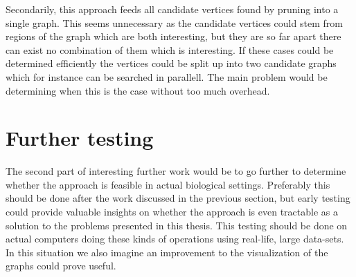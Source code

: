 \documentclass[thesis.tex]{subfiles}
\begin{document}
\par\noindent
Secondarily, this approach feeds all candidate vertices found by pruning into a single graph. This seems unnecessary as the candidate vertices could stem from regions of the graph which are both interesting, but they are so far apart there can exist no combination of them which is interesting. If these cases could be determined efficiently the vertices could be split up into two candidate graphs which for instance can be searched in parallell. The main problem would be determining when this is the case without too much overhead.
\section{Further testing}
The second part of interesting further work would be to go further to determine whether the approach is feasible in actual biological settings. Preferably this should be done after the work discussed in the previous section, but early testing could provide valuable insights on whether the approach is even tractable as a solution to the problems presented in this thesis. This testing should be done on actual computers doing these kinds of operations using real-life, large data-sets. In this situation we also imagine an improvement to the visualization of the graphs could prove useful.
\end{document}
